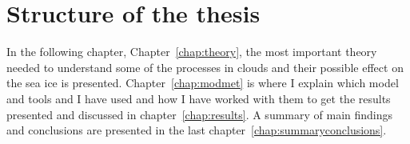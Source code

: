 \section{Structure of the thesis}
In the following chapter, Chapter~\ref{chap:theory}, the most important theory needed to understand some of the processes in clouds and their possible effect on the sea ice is presented. Chapter~\ref{chap:modmet} is where I explain which model and tools and I have used and how I have worked with them to get the results presented and discussed in chapter~\ref{chap:results}. A summary of main findings and conclusions are presented in the last chapter~\ref{chap:summaryconclusions}.
